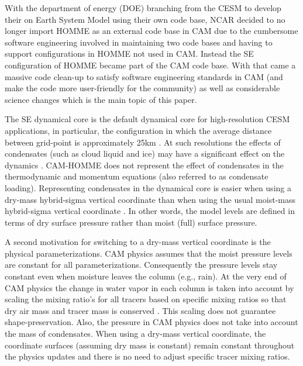 \documentclass{agujournal}
\begin{document}
With the department of energy (DOE) branching from the CESM to develop their on Earth System Model using their own code base, NCAR decided to no longer import HOMME as an external code base in CAM due to the cumbersome software engineering involved in maintaining two code bases and having to support configurations in HOMME not used in CAM. Instead the SE configuration of HOMME became part of the CAM code base. With that came a massive code clean-up to satisfy software engineering standards in CAM (and make the code more user-friendly for the community) as well as considerable science changes which is the main topic of this paper.

The SE dynamical core is the default dynamical core for high-resolution CESM applications, in particular, the configuration in which the average distance between grid-point is approximately 25km \citep{BetAl2013JC}. At such resolutions the effects of condensates (such as cloud liquid and ice) may have a significant effect on the dynamics \citep{BLDT2012GRL}. CAM-HOMME does not represent the effect of condensates in the thermodynamic and momentum equations (also referred to as condensate loading). Representing condensates in the dynamical core is easier when using a dry-mass hybrid-sigma vertical coordinate than when using the usual moist-mass hybrid-sigma vertical coordinate \citep[e.g., ][]{SB1981MWR}. In other words, the model levels are defined in terms of dry surface pressure rather than moist (full) surface pressure. {\color{red}{reference for dry-mass vertical coordinates?}}

A second motivation for switching to a dry-mass vertical coordinate is the physical parameterizations. CAM physics assumes that the moist pressure levels are constant for all parameterizations. Consequently the pressure levels stay constant even when moisture leaves the column (e.g., rain). At the very end of CAM physics the change in water  vapor in each column is taken into account by scaling the mixing ratio's for all tracers based on specific mixing ratios so that dry air mass and tracer mass is conserved \citep[see Section 3.1.6 in ][]{CAM5}. This scaling does not guarantee shape-preservation. Also, the pressure in CAM physics does not take into account the mass of condensates. When using a dry-mass vertical coordinate, the coordinate surfaces (assuming dry mass is constant) remain constant throughout the physics updates and there is no need to adjust specific tracer mixing ratios. {\color{red}{mentions IFS issues with dry mass conservation; ICON?}}
\end{document}
